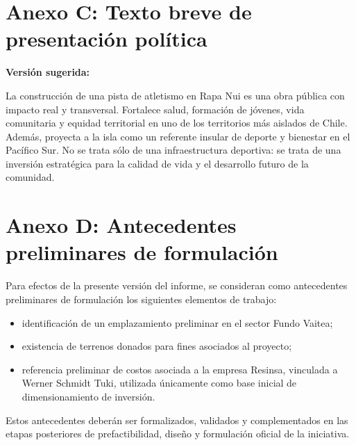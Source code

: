 \documentclass[12pt,letterpaper]{article}
\begin{document}
\section*{Anexo C: Texto breve de presentación política}

\textbf{Versión sugerida:}

La construcción de una pista de atletismo en Rapa Nui es una obra pública con impacto real y transversal. Fortalece salud, formación de jóvenes, vida comunitaria y equidad territorial en uno de los territorios más aislados de Chile. Además, proyecta a la isla como un referente insular de deporte y bienestar en el Pacífico Sur. No se trata sólo de una infraestructura deportiva: se trata de una inversión estratégica para la calidad de vida y el desarrollo futuro de la comunidad.

\section*{Anexo D: Antecedentes preliminares de formulación}

Para efectos de la presente versión del informe, se consideran como antecedentes preliminares de formulación los siguientes elementos de trabajo:

\begin{itemize}
    \item identificación de un emplazamiento preliminar en el sector Fundo Vaitea;
    \item existencia de terrenos donados para fines asociados al proyecto;
    \item referencia preliminar de costos asociada a la empresa Resinsa, vinculada a Werner Schmidt Tuki, utilizada únicamente como base inicial de dimensionamiento de inversión.
\end{itemize}

Estos antecedentes deberán ser formalizados, validados y complementados en las etapas posteriores de prefactibilidad, diseño y formulación oficial de la iniciativa.
\end{document}

